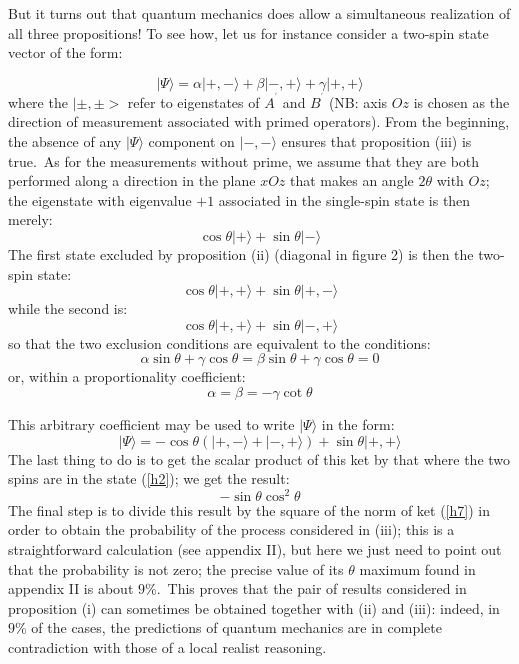 \documentclass[12pt,onecolumn]{article}%
\begin{document}
But it turns out that quantum mechanics does allow a simultaneous realization
of all three propositions! To see how, let us for instance consider a two-spin
state vector of the form:%

\begin{equation}
|\Psi\rangle =\alpha|+,-\rangle +\beta|-,+\rangle +\gamma|+,+\rangle  \label{h1}%
\end{equation}
where the $|\pm,\pm>$ refer to eigenstates of $A^{^{\prime}}$ and
$B^{^{\prime}}$ (NB: axis $Oz$ is chosen as the direction of measurement
associated with primed operators). From the beginning, the absence of any
$|\Psi\rangle $ component on $|-,-\rangle $ ensures that proposition (iii) is
true.\ As for the measurements without prime, we assume that they are both
performed along a direction in the plane $xOz$ that makes an angle $2\theta$
with $Oz$; the eigenstate with eigenvalue $+1$ associated in the single-spin
state is then merely:
\begin{equation}
\cos\theta|+\rangle +\sin\theta|-\rangle  \label{h2}%
\end{equation}
The first state excluded by proposition (ii) (diagonal in figure 2) is then
the two-spin state:
\begin{equation}
\cos\theta|+,+\rangle +\sin\theta|+,-\rangle  \label{h3}%
\end{equation}
while the second is:
\begin{equation}
\cos\theta|+,+\rangle +\sin\theta|-,+\rangle  \label{h4}%
\end{equation}
so that the two exclusion conditions are equivalent to the conditions:
\begin{equation}
\alpha\sin\theta+\gamma\cos\theta=\beta\sin\theta+\gamma\cos\theta=0
\label{h5}%
\end{equation}
or, within a proportionality coefficient:
\begin{equation}
\alpha=\beta=-\gamma\cot\theta\label{h6}%
\end{equation}


This arbitrary coefficient may be used to write $|\Psi\rangle $ in the form:
\begin{equation}
|\Psi\rangle =-\cos\theta\left(  |+,-\rangle +|-,+\rangle \right)  +\sin\theta|+,+\rangle 
\label{h7}%
\end{equation}
The last thing to do is to get the scalar product of this ket by that where
the two spins are in the state (\ref{h2}); we get the result:
\begin{equation}
-\sin\theta\cos^{2}\theta\label{h8}%
\end{equation}
The final step is to divide this result by the square of the norm of ket
(\ref{h7}) in order to obtain the probability of the process considered in
(iii); this is a straightforward calculation (see appendix II), but here we
just need to point out that the probability is not zero; the precise value of
its $\theta$ maximum found in appendix II is about $9\%$.\ This proves that
the pair of results considered in proposition (i) can sometimes be obtained
together with (ii) and (iii): indeed, in $9\%$ of the cases, the predictions
of quantum mechanics are in complete contradiction with those of a local
realist reasoning.
\end{document}
